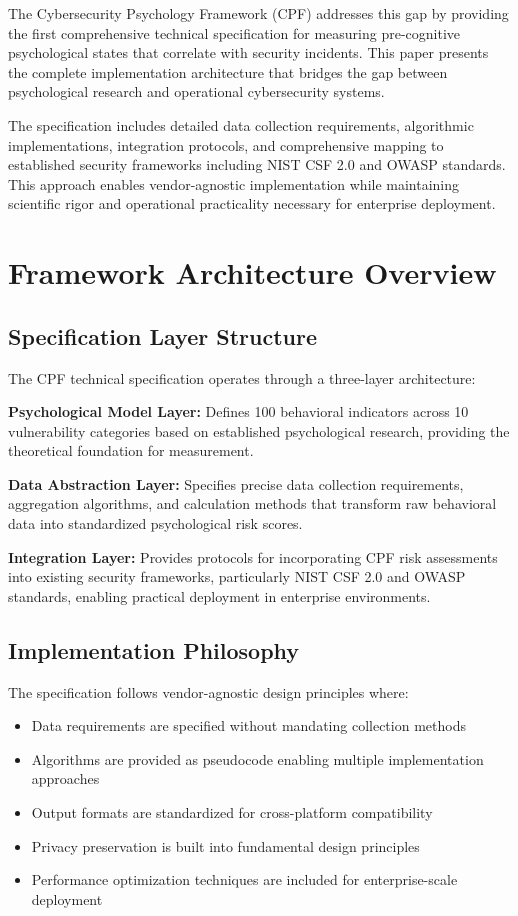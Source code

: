 \documentclass[10pt,twocolumn]{IEEEtran}
\begin{document}
The Cybersecurity Psychology Framework (CPF) \cite{canale2025} addresses this gap by providing the first comprehensive technical specification for measuring pre-cognitive psychological states that correlate with security incidents. This paper presents the complete implementation architecture that bridges the gap between psychological research and operational cybersecurity systems.

The specification includes detailed data collection requirements, algorithmic implementations, integration protocols, and comprehensive mapping to established security frameworks including NIST CSF 2.0 and OWASP standards. This approach enables vendor-agnostic implementation while maintaining scientific rigor and operational practicality necessary for enterprise deployment.

\section{Framework Architecture Overview}

\subsection{Specification Layer Structure}

The CPF technical specification operates through a three-layer architecture:

\textbf{Psychological Model Layer:} Defines 100 behavioral indicators across 10 vulnerability categories based on established psychological research, providing the theoretical foundation for measurement.

\textbf{Data Abstraction Layer:} Specifies precise data collection requirements, aggregation algorithms, and calculation methods that transform raw behavioral data into standardized psychological risk scores.

\textbf{Integration Layer:} Provides protocols for incorporating CPF risk assessments into existing security frameworks, particularly NIST CSF 2.0 and OWASP standards, enabling practical deployment in enterprise environments.

\subsection{Implementation Philosophy}

The specification follows vendor-agnostic design principles where:
\begin{itemize}
\item Data requirements are specified without mandating collection methods
\item Algorithms are provided as pseudocode enabling multiple implementation approaches
\item Output formats are standardized for cross-platform compatibility
\item Privacy preservation is built into fundamental design principles
\item Performance optimization techniques are included for enterprise-scale deployment
\end{itemize}
\end{document}
